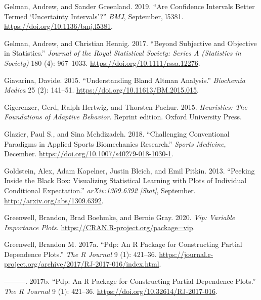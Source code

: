 \documentclass[
]{book}
\newlength{\cslhangindent}
\newenvironment{cslreferences}%
  {\setlength{\parindent}{0pt}%
  \everypar{\setlength{\hangindent}{\cslhangindent}}\ignorespaces}%
  {\par}
\begin{document}
\begin{cslreferences}
\leavevmode\hypertarget{ref-gelmanAreConfidenceIntervals2019}{}%
Gelman, Andrew, and Sander Greenland. 2019. ``Are Confidence Intervals Better Termed `Uncertainty Intervals'?'' \emph{BMJ}, September, l5381. \url{https://doi.org/10.1136/bmj.l5381}.

\leavevmode\hypertarget{ref-gelmanSubjectiveObjectiveStatistics2017}{}%
Gelman, Andrew, and Christian Hennig. 2017. ``Beyond Subjective and Objective in Statistics.'' \emph{Journal of the Royal Statistical Society: Series A (Statistics in Society)} 180 (4): 967--1033. \url{https://doi.org/10.1111/rssa.12276}.

\leavevmode\hypertarget{ref-giavarinaUnderstandingBlandAltman2015}{}%
Giavarina, Davide. 2015. ``Understanding Bland Altman Analysis.'' \emph{Biochemia Medica} 25 (2): 141--51. \url{https://doi.org/10.11613/BM.2015.015}.

\leavevmode\hypertarget{ref-gigerenzerHeuristicsFoundationsAdaptive2015}{}%
Gigerenzer, Gerd, Ralph Hertwig, and Thorsten Pachur. 2015. \emph{Heuristics: The Foundations of Adaptive Behavior}. Reprint edition. Oxford University Press.

\leavevmode\hypertarget{ref-glazierChallengingConventionalParadigms2018}{}%
Glazier, Paul S., and Sina Mehdizadeh. 2018. ``Challenging Conventional Paradigms in Applied Sports Biomechanics Research.'' \emph{Sports Medicine}, December. \url{https://doi.org/10.1007/s40279-018-1030-1}.

\leavevmode\hypertarget{ref-goldsteinPeekingBlackBox2013}{}%
Goldstein, Alex, Adam Kapelner, Justin Bleich, and Emil Pitkin. 2013. ``Peeking Inside the Black Box: Visualizing Statistical Learning with Plots of Individual Conditional Expectation.'' \emph{arXiv:1309.6392 {[}Stat{]}}, September. \url{http://arxiv.org/abs/1309.6392}.

\leavevmode\hypertarget{ref-R-vip}{}%
Greenwell, Brandon, Brad Boehmke, and Bernie Gray. 2020. \emph{Vip: Variable Importance Plots}. \url{https://CRAN.R-project.org/package=vip}.

\leavevmode\hypertarget{ref-R-pdp}{}%
Greenwell, Brandon M. 2017a. ``Pdp: An R Package for Constructing Partial Dependence Plots.'' \emph{The R Journal} 9 (1): 421--36. \url{https://journal.r-project.org/archive/2017/RJ-2017-016/index.html}.

\leavevmode\hypertarget{ref-RJ-2017-016}{}%
---------. 2017b. ``Pdp: An R Package for Constructing Partial Dependence Plots.'' \emph{The R Journal} 9 (1): 421--36. \url{https://doi.org/10.32614/RJ-2017-016}.


\end{cslreferences}
\end{document}
